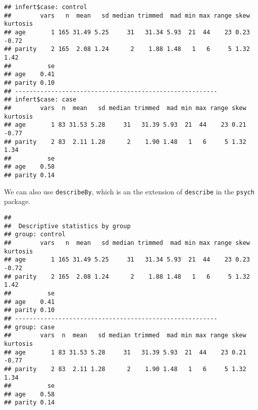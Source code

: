 \documentclass[]{book}
\newenvironment{Shaded}{\begin{snugshade}}{\end{snugshade}}
\newcommand{\KeywordTok}[1]{\textcolor[rgb]{0.13,0.29,0.53}{\textbf{{#1}}}}
\newcommand{\DataTypeTok}[1]{\textcolor[rgb]{0.13,0.29,0.53}{{#1}}}
\newcommand{\StringTok}[1]{\textcolor[rgb]{0.31,0.60,0.02}{{#1}}}
\newcommand{\NormalTok}[1]{{#1}}
\theoremstyle{definition}
\theoremstyle{definition}
\theoremstyle{remark}
\begin{document}
\begin{Shaded}
\end{Shaded}

\begin{verbatim}
## infert$case: control
##        vars   n  mean   sd median trimmed  mad min max range skew kurtosis
## age       1 165 31.49 5.25     31   31.34 5.93  21  44    23 0.23    -0.72
## parity    2 165  2.08 1.24      2    1.88 1.48   1   6     5 1.32     1.42
##          se
## age    0.41
## parity 0.10
## -------------------------------------------------------- 
## infert$case: case
##        vars  n  mean   sd median trimmed  mad min max range skew kurtosis
## age       1 83 31.53 5.28     31   31.39 5.93  21  44    23 0.21    -0.77
## parity    2 83  2.11 1.28      2    1.90 1.48   1   6     5 1.32     1.34
##          se
## age    0.58
## parity 0.14
\end{verbatim}

We can also use \texttt{describeBy}, which is an the extension of
\texttt{describe} in the \texttt{psych} package.

\begin{Shaded}
\end{Shaded}

\begin{verbatim}
## 
##  Descriptive statistics by group 
## group: control
##        vars   n  mean   sd median trimmed  mad min max range skew kurtosis
## age       1 165 31.49 5.25     31   31.34 5.93  21  44    23 0.23    -0.72
## parity    2 165  2.08 1.24      2    1.88 1.48   1   6     5 1.32     1.42
##          se
## age    0.41
## parity 0.10
## -------------------------------------------------------- 
## group: case
##        vars  n  mean   sd median trimmed  mad min max range skew kurtosis
## age       1 83 31.53 5.28     31   31.39 5.93  21  44    23 0.21    -0.77
## parity    2 83  2.11 1.28      2    1.90 1.48   1   6     5 1.32     1.34
##          se
## age    0.58
## parity 0.14
\end{verbatim}
\end{document}
